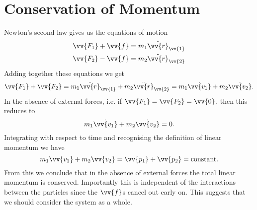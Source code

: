     \section{Conservation of Momentum}
    Newton's second law gives us the equations of motion
    \begin{align}
        \vv{F_1} + \vv{f} &= m_1\ddot{\vv{r}}_{\vv{1}}\label{eqn:two body eom 1}\\
        \vv{F_2} - \vv{f} &= m_2\ddot{\vv{r}}_{\vv{2}}\label{eqn:two body eom 2}
    \end{align}
    Adding together these equations we get
    \begin{equation}
        \vv{F_1} + \vv{F_2} = m_1\ddot{\vv{r}}_{\vv{1}} + m_2\ddot{\vv{r}}_{\vv{2}} = m_1\dot{\vv{v_1}} + m_2\dot{\vv{v_2}}.
    \end{equation}
    In the absence of external forces, i.e. if \(\vv{F_1} = \vv{F_2} = \vv{0}\), then this reduces to
    \begin{equation}
        m_1\dot{\vv{v_1}} + m_2\dot{\vv{v_2}} = 0.
    \end{equation}
    Integrating with respect to time and recognising the definition of linear momentum we have
    \begin{equation}
        m_1\vv{v_1} + m_2\vv{v_2} = \vv{p_1} + \vv{p_2} = \text{constant.}
    \end{equation}
    From this we conclude that in the absence of external forces the total linear momentum is conserved.
    Importantly this is independent of the interactions between the particles since the \(\vv{f}\)s cancel out early on.
    This suggests that we should consider the system as a whole.
    
